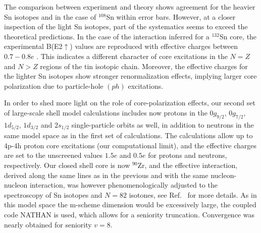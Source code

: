 \documentclass[prc,twocolumn,amssymb,amsmath,showpacs,superscriptaddress]{revtex4}
\begin{document}
The comparison between experiment and theory shows agreement for
the heavier Sn isotopes and in the case of $^{108}$Sn within error
bars. However, at a closer inspection of the light Sn isotopes,
part of the systematics seems to exceed the theoretical
predictions. In the case of the interaction inferred for a
$^{132}$Sn core, the experimental B(E2$\uparrow$) values are
reproduced with effective charges between $0.7-0.8e$ \cite{hol98}.
This indicates a different character of core excitations in the $N
= Z$ and $N > Z$ regions of the tin isotopic chain. Moreover, the
effective charges for the lighter Sn isotopes show stronger
renormalization effects, implying larger core polarization due to
particle-hole $(ph)$ excitations.

In order to shed more light on the role of core-polarization
effects, our second set of large-scale shell model calculations
includes now protons in the  $0g_{9/2}$, $0g_{7/2}$, $1d_{5/2}$,
$1d_{3/2}$ and $2s_{1/2}$ single-particle orbits as well, in
addition to neutrons in the same model space as in the first set
of calculations. The calculations allow up to 4p-4h proton core
excitations (our computational limit), and the effective charges
are set to the unscreened values $1.5e$ and $0.5e$ for protons and
neutrons, respectively. Our closed shell core is now $^{90}$Zr,
and the effective interaction, derived along the same lines as in
the previous and with the same nucleon-nucleon interaction, was
however phenomenologically adjusted to the spectroscopy of Sn
isotopes and $N = 82$ isotones, see Ref.~\cite{gni05} for more
details. As in this model space the m-scheme dimension
\cite{cau02} would be excessively large, the coupled code NATHAN
\cite{cau02} is used, which allows for a seniority truncation.
Convergence was nearly obtained for seniority $v=8$.
\end{document}
